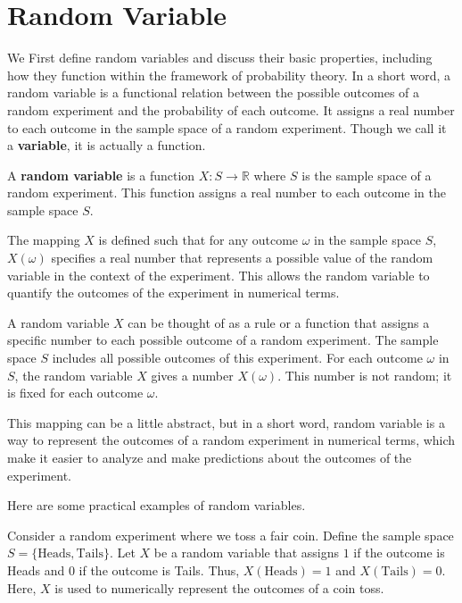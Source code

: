 \section{Random Variable}
We First define random variables and discuss their basic properties, including how they function within the framework of probability theory.
In a short word, a random variable is a functional relation between the possible outcomes of a random experiment
and the probability of each outcome. It assigns a real number to each outcome in the sample space of a random experiment. Though we call it a \textbf{variable}, it is actually a function.
\begin{definition}
    A \textbf{random variable} is a function \( X: S \rightarrow \mathbb{R} \) 
    where \( S \) is the sample space of a random experiment. This function 
    assigns a real number to each outcome in the sample space \( S \). 
    
    The mapping \( X \) is defined such that for any outcome \( \omega \) 
    in the sample space \( S \), \( X(\omega) \) specifies a real number 
    that represents a possible value of the random variable in the context 
    of the experiment. This allows the random variable to quantify 
    the outcomes of the experiment in numerical terms.
\end{definition}

A random variable \( X \) can be thought of as a rule or a function that assigns 
a specific number to each possible outcome of a random experiment. The sample 
space \( S \) includes all possible outcomes of this experiment. For each 
outcome \( \omega \) in \( S \), the random variable \( X \) gives a number 
\( X(\omega) \). This number is not random; it is fixed for each outcome 
\( \omega \).

This mapping can be a little abstract, but in a short word, random variable is a way to represent 
the outcomes of a random experiment in numerical terms, which make it easier to analyze and make predictions about the outcomes of the experiment.

Here are some practical examples of random variables.
\begin{example}
    Consider a random experiment where we toss a fair coin. Define the sample space 
    \( S = \{\text{Heads}, \text{Tails}\} \). Let \( X \) be a random variable that 
    assigns \( 1 \) if the outcome is Heads and \( 0 \) if the outcome is Tails. Thus, 
    \( X(\text{Heads}) = 1 \) and \( X(\text{Tails}) = 0 \). Here, \( X \) is used to 
    numerically represent the outcomes of a coin toss.
    \end{example}
    
